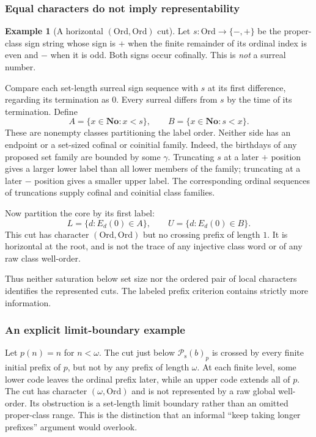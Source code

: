 \documentclass[11pt]{article}
\theoremstyle{definition}
\newtheorem{example}[example]{Example}
\theoremstyle{remark}
\newcommand{\No}{\mathbf{No}}
\newcommand{\Ord}{\mathrm{Ord}}
\newcommand{\Psupp}{\mathcal P_{\mathrm{s}}}
\begin{document}
\subsubsection{Equal characters do not imply representability}

\begin{example}[A horizontal $(\Ord,\Ord)$ cut]\label{swo:fs:ex:horizontalgap}
Let $s:\Ord\to\{-,+\}$ be the proper-class sign string whose sign is
$+$ when the finite remainder of its ordinal index is even and $-$
when it is odd. Both signs occur cofinally. This is \emph{not} a
surreal number.

Compare each set-length surreal sign sequence with $s$ at its first
difference, regarding its termination as $0$. Every surreal differs
from $s$ by the time of its termination. Define
\[
       A=\{x\in\No:x<s\},\qquad B=\{x\in\No:s<x\}.
\]
These are nonempty classes partitioning the label order. Neither
side has an endpoint or a set-sized cofinal or coinitial family.
Indeed, the birthdays of any proposed set family are bounded by some
$\gamma$. Truncating $s$ at a later $+$ position gives a larger lower
label than all lower members of the family; truncating at a later
$-$ position gives a smaller upper label. The corresponding ordinal
sequences of truncations supply cofinal and coinitial class families.

Now partition the core by its first label:
\[
           L=\{d:E_d(0)\in A\},\qquad U=\{d:E_d(0)\in B\}.
\]
This cut has character $(\Ord,\Ord)$ but no crossing prefix of
length $1$. It is horizontal at the root, and is not the trace of
any injective class word or of any raw class well-order.
\end{example}

Thus neither saturation below set size nor the ordered pair of local
characters identifies the represented cuts. The labeled prefix
criterion contains strictly more information.

\subsubsection{An explicit limit-boundary example}

Let $p(n)=n$ for $n<\omega$. The cut just below $\Psupp(b)_p$ is crossed by
every finite initial prefix of $p$, but not by any prefix of length
$\omega$. At each finite level, some lower code leaves the ordinal
prefix later, while an upper code extends all of $p$. The cut has
character $(\omega,\Ord)$ and is not represented by a raw global
well-order. Its obstruction is a set-length limit boundary rather than
an omitted proper-class range. This is the distinction that an informal
``keep taking longer prefixes'' argument would overlook.
\end{document}
